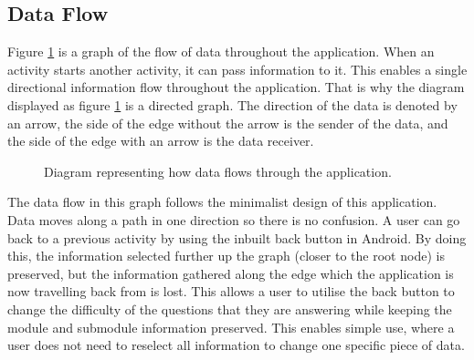 \documentclass{article}
\begin{document}
\subsection{Data Flow}

Figure \ref{figure:applicationDataFlow} is a graph of the flow of data throughout the application. When an activity starts another activity, it can pass information to it. This enables a single directional information flow throughout the application. That is why the diagram displayed as figure \ref{figure:applicationDataFlow} is a directed graph. The direction of the data is denoted by an arrow, the side of the edge without the arrow is the sender of the data, and the side of the edge with an arrow is the data receiver. 

\begin{figure}[H]
	\centering
	\caption{Diagram representing how data flows through the application.}
	\label{figure:applicationDataFlow}
\end{figure}

The data flow in this graph follows the minimalist design of this application. Data moves along a path in one direction so there is no confusion. A user can go back to a previous activity by using the inbuilt back button in Android. By doing this, the information selected further up the graph (closer to the root node) is preserved, but the information gathered along the edge which the application is now travelling back from is lost. This allows a user to utilise the back button to change the difficulty of the questions that they are answering while keeping the module and submodule information preserved. This enables simple use, where a user does not need to reselect all information to change one specific piece of data. \par
\end{document}
